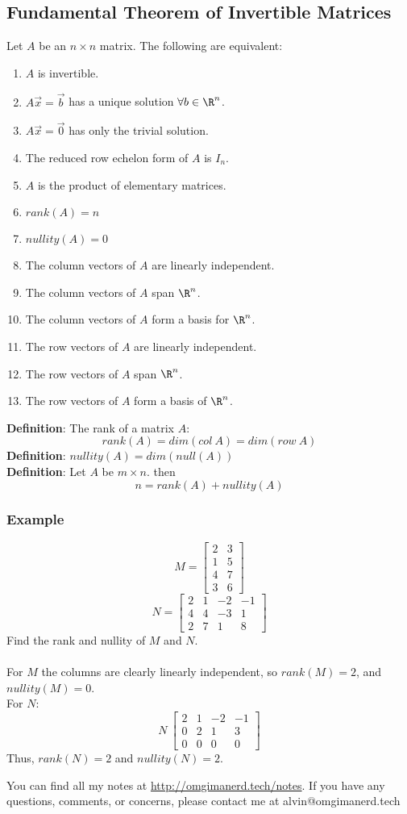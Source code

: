 \documentclass[letterpaper, 12pt]{math}
\begin{document}
\subsection*{Fundamental Theorem of Invertible Matrices}
Let \( A \) be an \( n\times n \) matrix. The following are equivalent:
\begin{enumerate}
  \item \( A \) is invertible.
  \item \( A\vec{x} = \vec{b} \) has a unique solution \( \forall{b}\in\R^n \).
  \item \( A\vec{x} = \vec{0} \) has only the trivial solution.
  \item The reduced row echelon form of \( A \) is \( I_n \).
  \item \( A \) is the product of elementary matrices.
  \item \( rank(A) = n \)
  \item \( nullity(A) = 0 \)
  \item The column vectors of \( A \) are linearly independent.
  \item The column vectors of \( A \) span \( \R^n \).
  \item The column vectors of \( A \) form a basis for \( \R^n \).
  \item The row vectors of \( A \) are linearly independent.
  \item The row vectors of \( A \) span \( \R^n \).
  \item The row vectors of \( A \) form a basis of \( \R^n \).
\end{enumerate}
\textbf{Definition}: The rank of a matrix \( A \):
\[ rank(A) = dim(col~A) = dim(row~A) \]
\textbf{Definition}: \( nullity(A) = dim(null(A)) \) \\
\textbf{Definition}: Let \( A \) be \( m\times n \). then
\[ n = rank(A)+nullity(A) \]

\subsubsection*{Example}
\[ M = \begin{bmatrix}2 & 3 \\ 1 & 5 \\ 4 & 7 \\ 3 & 6\end{bmatrix} \]
\[ N = \begin{bmatrix}2 & 1 & -2 & -1 \\ 4 & 4 & -3 & 1 \\ 2 & 7 & 1 &
  8\end{bmatrix} \]
Find the rank and nullity of \( M \) and \( N \). \\ \\
For \( M \) the columns are clearly linearly independent, so \( rank(M) = 2 \),
and \( nullity(M) = 0 \). \\
For \( N \):
\[ N~\begin{bmatrix}2 & 1 & -2 & -1 \\ 0 & 2 & 1 & 3 \\ 0 & 0 & 0 &
  0\end{bmatrix} \]
Thus, \( rank(N) = 2 \) and \( nullity(N) = 2 \).

\begin{center}
  You can find all my notes at \url{http://omgimanerd.tech/notes}. If you have
  any questions, comments, or concerns, please contact me at
  alvin@omgimanerd.tech
\end{center}
\end{document}
